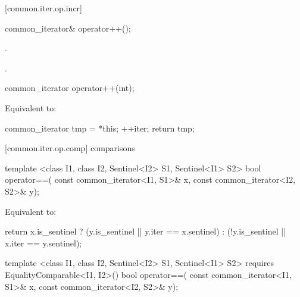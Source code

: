 [common.iter.op.incr]{}

%
%
\begin{itemdecl}
common_iterator& operator++();
\end{itemdecl}

\begin{itemdescr}
\pnum
\requires {}

\pnum
\effects {}.

\pnum
\returns {}.
\end{itemdescr}

%
%
\begin{itemdecl}
common_iterator operator++(int);
\end{itemdecl}

\begin{itemdescr}
\pnum
\requires {}

\pnum
\effects Equivalent to:
\begin{codeblock}
common_iterator tmp = *this;
++iter;
return tmp;
\end{codeblock}
\end{itemdescr}

[common.iter.op.comp]{ comparisons}

%
%
\begin{itemdecl}
template <class I1, class I2, Sentinel<I2> S1, Sentinel<I1> S2>
bool operator==(
  const common_iterator<I1, S1>& x, const common_iterator<I2, S2>& y);
\end{itemdecl}

\begin{itemdescr}
\pnum
\effects Equivalent to:
\begin{codeblock}
  return x.is_sentinel ?
    (y.is_sentinel || y.iter == x.sentinel) :
    (!y.is_sentinel || x.iter == y.sentinel);
\end{codeblock}
\end{itemdescr}

%
%
\begin{itemdecl}
template <class I1, class I2, Sentinel<I2> S1, Sentinel<I1> S2>
  requires EqualityComparable<I1, I2>()
bool operator==(
  const common_iterator<I1, S1>& x, const common_iterator<I2, S2>& y);
\end{itemdecl}

